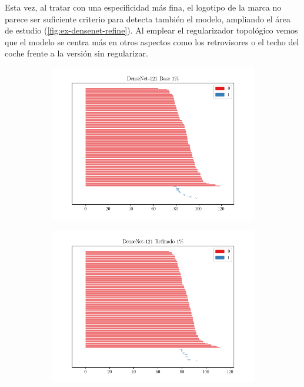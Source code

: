 Esta vez, al tratar con una especificidad más fina, el logotipo de la marca no parece
ser suficiente criterio para detecta también el modelo, ampliando el área de
estudio (\autoref{fig:ex-densenet-refine}). Al emplear el regularizador topológico
vemos que el modelo se centra más en otros aspectos como los retrovisores o el techo
del coche frente a la versión sin regularizar.

\begin{figure}[H]
	\centering
	\begin{subfigure}
		{.5\textwidth}
		\centering
		\includegraphics[width=\linewidth]{img/bar_densenet_base_0.01.png}
	\end{subfigure}%
	\begin{subfigure}
		{.5\textwidth}
		\centering
		\includegraphics[width=\linewidth]{img/bar_densenet_refine_0.01.png}

\end{subfigure}
\end{figure}

